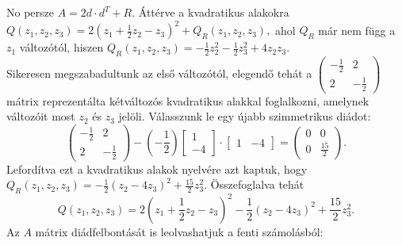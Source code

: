 \documentclass[a4paper, showtrims]{memoir}
\theoremstyle{plain}
\theoremstyle{remark}
\theoremstyle{definition}
\begin{document}
    No persze $A=2d\cdot d^T+R$.
    Áttérve a kvadratikus alakokra
    \(
        Q\left( z_1,z_2,z_3 \right)=2\left( z_1+\frac{1}{2}z_2-z_3 \right)^2+Q_R\left( z_1,z_2,z_3 \right),
    \)
    ahol $Q_R$ már nem függ a $z_1$ változótól, 
    hiszen $Q_R\left( z_1,z_2,z_3 \right)=-\frac{1}{2}z_2^2-\frac{1}{2}z_3^2+4z_2z_3$.
    \\
    Sikeresen megszabadultunk az első változótól, elegendő tehát a 
    \(
    \begin{pmatrix}
        -\frac{1}{2}&2\\
        2&-\frac{1}{2}
    \end{pmatrix}
    \)
    mátrix reprezentálta kétváltozós kvadratikus alakkal foglalkozni, amelynek változóit most $z_2$ és $z_3$ jelöli.
    Válasszunk le egy újabb szimmetrikus diádot:
    \[
        \begin{pmatrix}
            -\frac{1}{2}&2\\
            2&-\frac{1}{2}
        \end{pmatrix}
        -\left( -\frac{1}{2} \right)
        \begin{bmatrix}
            1\\-4
        \end{bmatrix}
        \cdot
        \begin{bmatrix}
            1&-4
        \end{bmatrix}
        =
        \begin{pmatrix}
            0&0\\
            0&\frac{15}{2}
        \end{pmatrix}.
    \]
    Lefordítva ezt a kvadratikus alakok nyelvére azt kaptuk,
    hogy
    \(
        Q_R\left( z_1,z_2,z_3 \right)
        =
        -\frac{1}{2}\left( z_2-4z_3 \right)^2+\frac{15}{2}z_3^2.
    \)
    Összefoglalva tehát
    \[
        Q\left( z_1,z_2,z_3 \right)
        =
        2\left( z_1+\frac{1}{2}z_2-z_3 \right)^2
        -\frac{1}{2}\left( z_2-4z_3 \right)^2
        +\frac{15}{2}z_3^2.
    \]
    Az $A$ mátrix diádfelbontását is leolvashatjuk a fenti számolásból:
\end{document}
